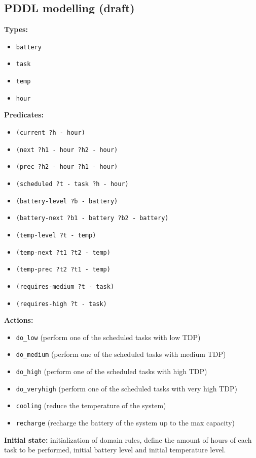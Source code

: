 \documentclass[12pt]{article}
\begin{document}
\subsection{PDDL modelling (draft)}
\textbf{Types:}
\begin{itemize}
    \item \verb|battery|
    \item \verb|task|
    \item \verb|temp|
    \item \verb|hour|
\end{itemize}
\bigbreak
\textbf{Predicates:}
\begin{itemize}
    \item \verb|(current ?h - hour)|
    \item \verb|(next ?h1 - hour ?h2 - hour)|
    \item \verb|(prec ?h2 - hour ?h1 - hour)|
    \item \verb|(scheduled ?t - task ?h - hour)|
    \item \verb|(battery-level ?b - battery)|
    \item \verb|(battery-next ?b1 - battery ?b2 - battery)|
    \item \verb|(temp-level ?t - temp)|
    \item \verb|(temp-next ?t1 ?t2 - temp)|
    \item \verb|(temp-prec ?t2 ?t1 - temp)|
    \item \verb|(requires-medium ?t - task)|
    \item \verb|(requires-high ?t - task)|
\end{itemize}
\bigbreak
\textbf{Actions:}
\begin{itemize}
    \item \verb|do_low| (perform one of the scheduled tasks with low TDP)
    \item \verb|do_medium| (perform one of the scheduled tasks with medium TDP)
    \item \verb|do_high| (perform one of the scheduled tasks with high TDP)
    \item \verb|do_veryhigh| (perform one of the scheduled tasks with very high TDP)
    \item \verb|cooling| (reduce the temperature of the system)
    \item \verb|recharge| (recharge the battery of the system up to the max capacity)
\end{itemize}
\bigbreak
\par\noindent\textbf{Initial state:} initialization of domain rules, define the amount of hours of each task to be performed, initial battery level and initial temperature level.
\end{document}

